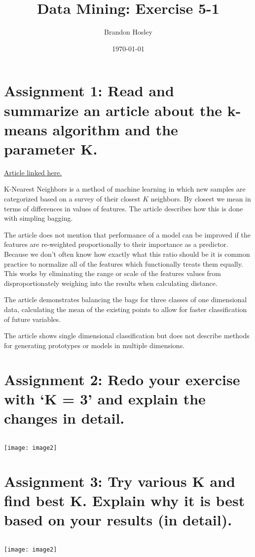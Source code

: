 \documentclass[]{article}
\title{Data Mining: Exercise 5-1}
\author{Brandon Hosley}
\date{\today}
\begin{document}
\maketitle

\section*{Assignment 1: Read and summarize an article about the k-means algorithm and the parameter K.}
\href{https://towardsdatascience.com/how-does-k-means-clustering-in-machine-learning-work-fdaaaf5acfa0}{Article linked here.}

K-Nearest Neighbors is a method of machine learning in which new samples are categorized based on a survey of their closest $K$ neighbors. By closest we mean in terms of differences in values of features. The article describes how this is done with simpling bagging. 

The article does not mention that performance of a model can be improved if the features are re-weighted proportionally to their importance as a predictor. Because we don't often know how exactly what this ratio should be it is common practice to normalize all of the features which functionally treats them equally. This works by eliminating the range or scale of the features values from disproportionately weighing into the results when calculating distance.

The article demonstrates balancing the bags for three classes of one dimensional data, calculating the mean of the existing points to allow for faster classification of future variables.

The article shows single dimensional classification but does not describe methods for generating prototypes or models in multiple dimensions.


\section*{Assignment 2: Redo your exercise with ‘K = 3’ and explain the changes in detail.}


\begin{verbatim}

\end{verbatim}
\texttt{[image: image2]}


\section*{Assignment 3: Try various K and find best K. Explain why it is best based on your results (in detail).}

\begin{verbatim}

\end{verbatim}
\texttt{[image: image2]}
\end{document}
